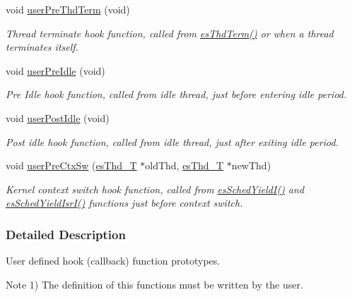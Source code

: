\begin{DoxyCompactItemize}
void \hyperlink{group__kern__hook_ga076ad76633999c9d5e245e3b5c6e0c09}{user\-Pre\-Thd\-Term} (void)
\begin{DoxyCompactList}\small\item\em Thread terminate hook function, called from \hyperlink{group__kern__thd_gac9d1eac76f26096614e8196bcfd8b905}{es\-Thd\-Term()} or when a thread terminates itself. \end{DoxyCompactList}\item 
void \hyperlink{group__kern__hook_ga2bd40d82f768787c3dab2f4df336685e}{user\-Pre\-Idle} (void)
\begin{DoxyCompactList}\small\item\em Pre Idle hook function, called from idle thread, just before entering idle period. \end{DoxyCompactList}\item 
void \hyperlink{group__kern__hook_ga7ca4a96cbe5064d633298d1d172fd4e7}{user\-Post\-Idle} (void)
\begin{DoxyCompactList}\small\item\em Post idle hook function, called from idle thread, just after exiting idle period. \end{DoxyCompactList}\item 
void \hyperlink{group__kern__hook_ga74a38c965110d0f2f2e44e13571fe3fc}{user\-Pre\-Ctx\-Sw} (\hyperlink{group__kern__thd_ga62e3a3ca0a4597a19c43cb8868810d82}{es\-Thd\-\_\-\-T} $\ast$old\-Thd, \hyperlink{group__kern__thd_ga62e3a3ca0a4597a19c43cb8868810d82}{es\-Thd\-\_\-\-T} $\ast$new\-Thd)
\begin{DoxyCompactList}\small\item\em Kernel context switch hook function, called from \hyperlink{group__kern__sched_gaf90e487bfce974dafaeed5009e189810}{es\-Sched\-Yield\-I()} and \hyperlink{group__kern__sched_gafbea29b376b29f11bbfc48a0f5144e9a}{es\-Sched\-Yield\-Isr\-I()} functions just before context switch. \end{DoxyCompactList}\end{DoxyCompactItemize}


\subsubsection{Detailed Description}
User defined hook (callback) function prototypes. \begin{DoxyNote}{Note}
1) The definition of this functions must be written by the user. 
\end{DoxyNote}


